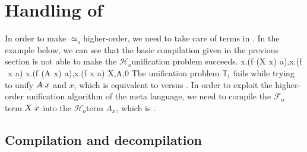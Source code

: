 \documentclass[sigconf,natbib=false,review]{acmart}
\newcommand{\appsep}{\ensuremath{\textcolor{lightgray}{\cdot}}}
\newcommand{\UnifRel}{\ensuremath{\simeq}}
\newcommand{\Uo}{\texorpdfstring{\ensuremath{\UnifRel_o}\xspace}{unif\_o}}
\newcommand{\Fo}{\texorpdfstring{\ensuremath{\mathcal{F}_{\!o}\xspace}}{Fo}} %
\newcommand{\Ho}{\texorpdfstring{\ensuremath{\mathcal{H}_o}\xspace}{Ho}}
\newcommand{\hoUnifPb}{\ensuremath{\mathbb{T}}\xspace}
\begin{document}

  
\section{Handling of \maybebeta}\label{sec:llam}

In order to make \Uo higher-order, we need to
take care of terms in \maybebeta.
In the example below, we can see that the basic compilation given in 
the previous section is not able to make the \Ho unification problem succeeds.
%
\printAlll
  {{{\lambda x.(f\appsep (X\appsep x)\appsep a),\lambda x.(f\appsep x\appsep a)}}}
  {{{\lambda x.(f\appsep (A\appsep x)\appsep a),\lambda x.(f\appsep x\appsep a)}}}
  {{{X,A,0}}}
  {{}}
The unification problem $\hoUnifPb_1$ fails while trying to unify
$A \appsep x$ and $x$, which is equivalent to 
versus .
In order to exploit the higher-order unification algorithm of the meta language,
we need to compile the \Fo{} term $X\appsep x$ into the \Ho term $A_x$,
which is .

\subsection{Compilation and decompilation}
\end{document}
